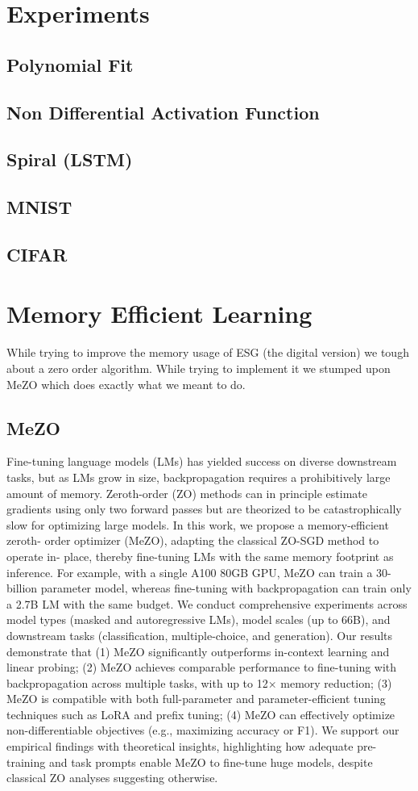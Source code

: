 \documentclass[nohyperref]{article}
\theoremstyle{plain}
\theoremstyle{definition}
\theoremstyle{remark}
\begin{document}
\section{Experiments}
\subsection{Polynomial Fit}
\subsection{Non Differential Activation Function}
\subsection{Spiral (LSTM)}
\subsection{MNIST}
\subsection{CIFAR}


\section{Memory Efficient Learning}
While trying to improve the memory usage of ESG (the digital version) we tough about a zero order algorithm.
While trying to implement it we stumped upon MeZO \cite{malladi2023finetuning} which does exactly what we meant to do.  
\subsection{MeZO}
Fine-tuning language models (LMs) has yielded success on diverse downstream
tasks, but as LMs grow in size, backpropagation requires a prohibitively large
amount of memory. Zeroth-order (ZO) methods can in principle estimate gradients
using only two forward passes but are theorized to be catastrophically slow for
optimizing large models. In this work, we propose a memory-efficient zeroth-
order optimizer (MeZO), adapting the classical ZO-SGD method to operate in-
place, thereby fine-tuning LMs with the same memory footprint as inference. For
example, with a single A100 80GB GPU, MeZO can train a 30-billion parameter
model, whereas fine-tuning with backpropagation can train only a 2.7B LM with
the same budget. We conduct comprehensive experiments across model types
(masked and autoregressive LMs), model scales (up to 66B), and downstream tasks
(classification, multiple-choice, and generation). Our results demonstrate that (1)
MeZO significantly outperforms in-context learning and linear probing; (2) MeZO
achieves comparable performance to fine-tuning with backpropagation across
multiple tasks, with up to 12× memory reduction; (3) MeZO is compatible with
both full-parameter and parameter-efficient tuning techniques such as LoRA and
prefix tuning; (4) MeZO can effectively optimize non-differentiable objectives (e.g.,
maximizing accuracy or F1). We support our empirical findings with theoretical
insights, highlighting how adequate pre-training and task prompts enable MeZO to
fine-tune huge models, despite classical ZO analyses suggesting otherwise.
\end{document}
